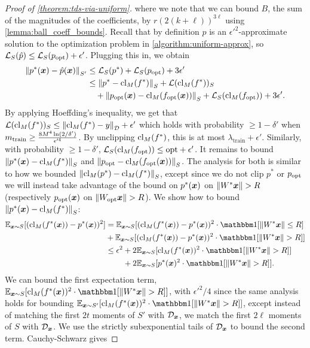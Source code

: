 \documentclass[11pt]{article} %
\numberwithin{equation}{section}
\begin{document}
\begin{proof}[Proof of \cref{theorem:tds-via-uniform}]
    where we note that we can bound $B$, the sum of the magnitudes of the coefficients, by $r(2(k+\ell))^{3\ell}$ using \cref{lemma:ball_coeff_bounds}.
    Recall that by definition $\hat{p}$ is an $\epsilon'^2$-approximate solution to the optimization problem in \cref{algorithm:uniform-approx}, so ${\mathcal{L}}_S(\hat{p}) \le {\mathcal{L}}_S (p_{\mathrm{opt}})+ \epsilon'$. Plugging this in, we obtain
    \begin{align}
        \left\| p^*({\bm{x}}) - \hat{p}({\bm{x}}) \right\|_{S'} &\le {\mathcal{L}}_S (p^*)+ {\mathcal{L}}_S(p_{\mathrm{opt}}) + 3\epsilon' \notag \\
        &\le \left\| p^* - \mathrm{cl}_M(f^{*}) \right\|_S + {\mathcal{L}}(\mathrm{cl}_M(f^{*}))_S \notag \\ 
        &\quad + \left\| p_{\mathrm{opt}}({\bm{x}}) - \mathrm{cl}_M(f_{\mathrm{opt}}({\bm{x}})) \right\|_S + {\mathcal{L}}_S(\mathrm{cl}_M(f_{\mathrm{opt}})) + 3\epsilon'. \label{eqn: ps_phat}
    \end{align}
    By applying Hoeffding's inequality, we get that ${\mathcal{L}}(\mathrm{cl}_M(f^{*}))_S \le \left\| \mathrm{cl}_M(f^{*}) - y \right\|_{\mathcal{D}} + \epsilon'$ which holds with probability $\ge 1 - \delta'$ when $m_{\mathrm{train}} \ge \frac{8M^4 \ln(2/\delta')}{\epsilon'^4}$. By unclipping $\mathrm{cl}_M(f^{*})$, this is at most $\lambda_\mathrm{train} + \epsilon'$. Similarly, with probability $\ge 1 - \delta'$, ${\mathcal{L}}_S(\mathrm{cl}_M(f_{\mathrm{opt}})) \le \mathrm{opt} + \epsilon'$. It remains to bound $\left\| p^*({\bm{x}}) - \mathrm{cl}_M(f^{*}) \right\|_S$ and $\left\| p_{\mathrm{opt}} - \mathrm{cl}_M(f_{\mathrm{opt}}({\bm{x}})) \right\|_S$. The analysis for both is similar to how we bounded $\left\| \mathrm{cl}_M(p^{*}) - \mathrm{cl}_M(f^{*}) \right\|_S$, except since we do not clip $p^*$ or $p_{\mathrm{opt}}$ we will instead take advantage of the bound on $p^*({\bm{x}})$ on $\left\| W^*{\bm{x}} \right\| > R$ (respectively $p_{\mathrm{opt}}({\bm{x}})$ on $\left\| W_{\mathrm{opt}}{\bm{x}} \right\| > R$). We show how to bound $\left\| p^*({\bm{x}}) - \mathrm{cl}_M(f^{*}) \right\|_S$:
    \begin{align}
        \E_{\x \sim S}[(\fsMx - p^*(\x))^2] &= \E_{\x \sim S}[(\fsMx - p^*(\x))^2 \cdot \ind[\Norm{W^*\x} \le R] \notag \\
        &+ \E_{\x \sim S}[(\fsMx - p^*(\x))^2 \cdot \ind[\Norm{W^*\x} >R]] \notag \\
        &\le \epsilon^2 + 2\E_{\x \sim S}[\fsMx^2 \cdot \ind[\Norm{W^*\x} >R]] \notag \\
        &\hspace{2.2em} + 2\E_{\x \sim S}[p^*(\x)^2 \cdot \ind[\Norm{W^*\x} >R]]. \label{eqn: fsM_ps}
    \end{align}
    We can bound the first expectation term, $\E_{\x \sim S}[\fsMx^2 \cdot \ind[\Norm{W^*\x} >R]]$, with $\epsilon'^2/4$ since the same analysis holds for bounding $\E_{\x \sim S'}[\fsMx^2 \cdot \ind[\Norm{W^*\x} >R]]$, except instead of matching the first $2t$ moments of $S'$ with ${\mathcal{D}}_{{\bm{x}}}$, we match the first $2\ell$ moments of $S$ with ${\mathcal{D}}_{{\bm{x}}}$. We use the strictly subexponential tails of ${\mathcal{D}}_{{\bm{x}}}$ to bound the second term. Cauchy-Schwarz gives

\end{proof}
\end{document}
